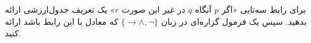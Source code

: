 برای رابط سه‌تایی «اگر $p$ آنگاه $q$ در غیر این صورت $r$» یک تعریف جدول‌ارزشی ارائه بدهید. سپس یک فرمول گزاره‌ای در زبان
$\{\to\wedge,\neg\}$
که معادل با این رابط باشد ارائه کنید.
\begin{ans}
\end{ans}
